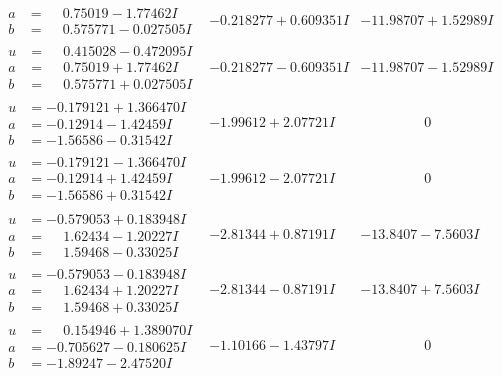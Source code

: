 \documentclass[1p]{elsarticle_modified}
\theoremstyle{definition}
\begin{document}
$$\begin{array}{c|c|c}
\begin{aligned}
a &= \phantom{-}0.75019 - 1.77462 I \\
b &= \phantom{-}0.575771 - 0.027505 I\end{aligned}
 & -0.218277 + 0.609351 I & -11.98707 + 1.52989 I \\ \hline\begin{aligned}
u &= \phantom{-}0.415028 - 0.472095 I \\
a &= \phantom{-}0.75019 + 1.77462 I \\
b &= \phantom{-}0.575771 + 0.027505 I\end{aligned}
 & -0.218277 - 0.609351 I & -11.98707 - 1.52989 I \\ \hline\begin{aligned}
u &= -0.179121 + 1.366470 I \\
a &= -0.12914 - 1.42459 I \\
b &= -1.56586 - 0.31542 I\end{aligned}
 & -1.99612 + 2.07721 I & \phantom{-0.000000 } 0 \\ \hline\begin{aligned}
u &= -0.179121 - 1.366470 I \\
a &= -0.12914 + 1.42459 I \\
b &= -1.56586 + 0.31542 I\end{aligned}
 & -1.99612 - 2.07721 I & \phantom{-0.000000 } 0 \\ \hline\begin{aligned}
u &= -0.579053 + 0.183948 I \\
a &= \phantom{-}1.62434 - 1.20227 I \\
b &= \phantom{-}1.59468 - 0.33025 I\end{aligned}
 & -2.81344 + 0.87191 I & -13.8407 - 7.5603 I \\ \hline\begin{aligned}
u &= -0.579053 - 0.183948 I \\
a &= \phantom{-}1.62434 + 1.20227 I \\
b &= \phantom{-}1.59468 + 0.33025 I\end{aligned}
 & -2.81344 - 0.87191 I & -13.8407 + 7.5603 I \\ \hline\begin{aligned}
u &= \phantom{-}0.154946 + 1.389070 I \\
a &= -0.705627 - 0.180625 I \\
b &= -1.89247 - 2.47520 I\end{aligned}
 & -1.10166 - 1.43797 I & \phantom{-0.000000 } 0 \\ \hline\begin{aligned}

\end{aligned}
\end{array}$$
\end{document}
